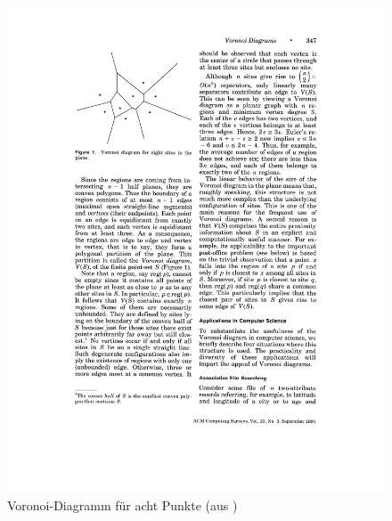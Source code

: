 \begin{figure}[htbp]
\centering
\includegraphics{grafics/voronoi_grund_aus_aurenhammer.pdf}
\caption{Voronoi-Diagramm für acht Punkte (aus \cite{Aurenhammer1991Voronoi})}
\label{fig:voronoi_grund}
\end{figure}





